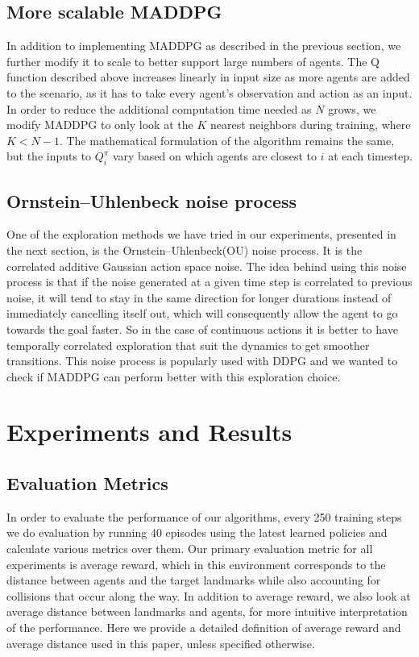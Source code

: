 \documentclass{article}
\begin{document}
\subsection{More scalable MADDPG}
In addition to implementing MADDPG as described in the previous section, we further modify it to scale to better support large numbers of agents. The Q function described above increases linearly in input size as more agents are added to the scenario, as it has to take every agent's observation and action as an input. In order to reduce the additional computation time needed as $N$ grows, we modify MADDPG to only look at the $K$ nearest neighbors during training, where $K < N-1$. The mathematical formulation of the algorithm remains the same, but the inputs to $Q^\pi_i$ vary based on which agents are closest to $i$ at each timestep.

\subsection{Ornstein–Uhlenbeck noise process}
One of the exploration methods we have tried in our experiments, presented in the next section, is the Ornstein–Uhlenbeck(OU) noise process. It is the correlated additive Gaussian action space noise. The idea behind using this noise process is that if the noise generated at a given time step is correlated to previous noise, it will tend to stay in the same direction for longer durations instead of immediately cancelling itself out, which will consequently allow the agent to go towards the goal faster. So in the case of continuous actions it is better to have temporally correlated exploration that suit the dynamics to get smoother transitions. This noise process is popularly used with DDPG and we wanted to check if MADDPG can perform better with this exploration choice.

\section{Experiments and Results}
\subsection{Evaluation Metrics}

In order to evaluate the performance of our algorithms, every 250 training steps we do evaluation by running 40 episodes using the latest learned policies and calculate various metrics over them. Our primary evaluation metric for all experiments is average reward, which in this environment corresponds to the distance between agents and the target landmarks while also accounting for collisions that occur along the way. In addition to average reward, we also look at average distance between landmarks and agents, for more intuitive interpretation of the performance. Here we provide a detailed definition of average reward and average distance used in this paper, unless specified otherwise.
\end{document}
